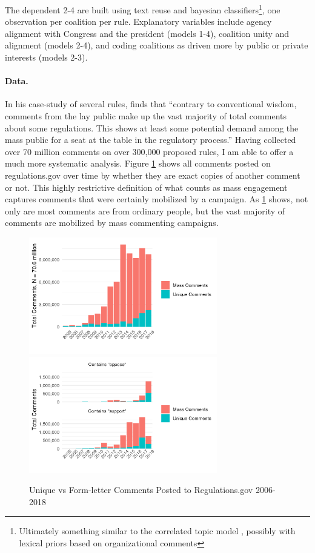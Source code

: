 The dependent 2-4 are built using text reuse and bayesian classifiers\footnote{
Ultimately something similar to the correlated topic model \citep{Blei2005}, possibly with lexical priors \citep{Fong2016} based on organizational comments
},
one observation per coalition per rule. Explanatory variables include agency alignment with Congress and the president (models 1-4), coalition unity and alignment (models 2-4), and coding coalitions as driven more by public or private interests (models 2-3).%





\paragraph{Data.}
In his case-study of several rules, \citet{Cuellar2005} finds that ``contrary to conventional wisdom, comments from the lay public make up the vast majority of total comments about some regulations. This shows at least some potential demand among the mass public for a seat at the table in the regulatory process.'' 
Having collected over 70 million comments on over 300,000 proposed rules, I am able to offer a much more systematic analysis. Figure \ref{fig:comments-mass} shows all comments posted on regulations.gov over time by whether they are exact copies of another comment or not. This highly restrictive definition of what counts as mass engagement captures comments that were certainly mobilized by a campaign. As \ref{fig:comments-mass} shows, not only are most comments are from ordinary people, but the vast majority of comments are mobilized by mass commenting campaigns.

\begin{figure}[h!]
    \centering
        \caption{Unique vs Form-letter Comments Posted to Regulations.gov 2006-2018}
    \includegraphics[height =2in]{Figs/comments-mass-vs-unique-1.png}
    \includegraphics[height =2in]{Figs/comments-mass-support-vs-oppose-1.png}

    \label{fig:comments-mass}
\end{figure}

